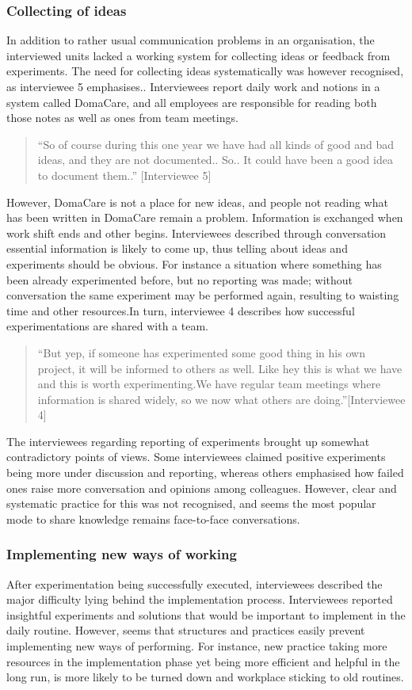 \subsubsection{Collecting of ideas}
In addition to rather usual communication problems in an organisation, the interviewed units lacked a working system for collecting ideas or feedback from experiments. The need for collecting ideas systematically was however recognised, as interviewee 5 emphasises.. Interviewees report daily work and notions in a system called DomaCare, and all employees are responsible for reading both those notes as well as ones from team meetings. 
\begin{quote}
``So of course during this one year we have had all kinds of good and bad ideas, and they are not documented.. So.. It could have been a good idea to document them..'' [Interviewee 5]
\end{quote}
However, DomaCare is not a place for new ideas, and people not reading what has been written in DomaCare remain a problem. Information is exchanged when work shift ends and other begins. Interviewees described through conversation essential information is likely to come up, thus telling about ideas and experiments should be obvious. For instance a situation where something has been already experimented before, but no reporting was made; without conversation the same experiment may be performed again, resulting to waisting time and other resources.In turn, interviewee 4 describes how successful experimentations are shared with a team. 
\begin{quote}
``But yep, if someone has experimented some good thing in his own project, it will be informed to others as well. Like hey this is what we have and this is worth experimenting.We have regular team meetings where information is shared widely, so we now what others are doing.''[Interviewee 4]
\end{quote}
The interviewees regarding reporting of experiments brought up somewhat contradictory points of views. Some interviewees claimed positive experiments being more under discussion and reporting, whereas others emphasised how failed ones raise more conversation and opinions among colleagues. However, clear and systematic practice for this was not recognised, and seems the most popular mode to share knowledge remains face-to-face conversations.

\subsubsection{Implementing new ways of working}
After experimentation being successfully executed, interviewees described the major difficulty lying behind the implementation process. Interviewees reported insightful experiments and solutions that would be important to implement in the daily routine. However, seems that structures and practices easily prevent implementing new ways of performing. For instance, new practice taking more resources in the implementation phase yet being more efficient and helpful in the long run, is more likely to be turned down and workplace sticking to old routines. 

